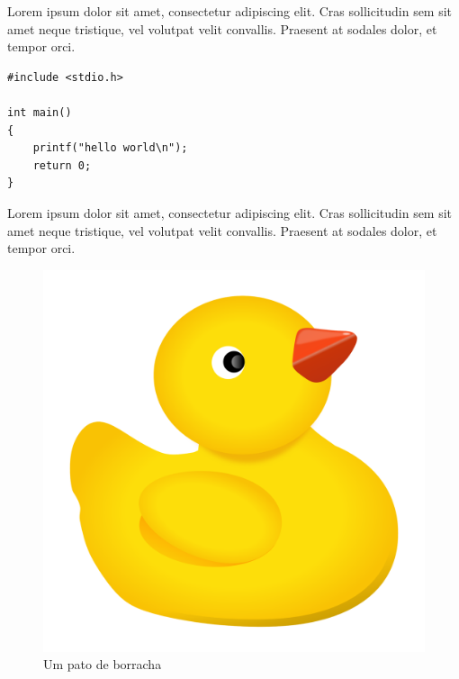 \newpage

Lorem ipsum dolor sit amet, consectetur adipiscing elit. Cras sollicitudin sem sit amet neque tristique, vel volutpat velit convallis. Praesent at sodales dolor, et tempor orci.
\begin{verbatim}
#include <stdio.h>

int main()
{
    printf("hello world\n");
    return 0;
}
\end{verbatim}

\newpage
Lorem ipsum dolor sit amet, consectetur adipiscing elit. Cras sollicitudin sem sit amet neque tristique, vel volutpat velit convallis. Praesent at sodales dolor, et tempor orci.
\begin{figure}[hb]
    \centering
    \includegraphics[scale=0.08]{./pato.png}
    \caption{Um pato de borracha}
    \label{fig:pato}
\end{figure}
